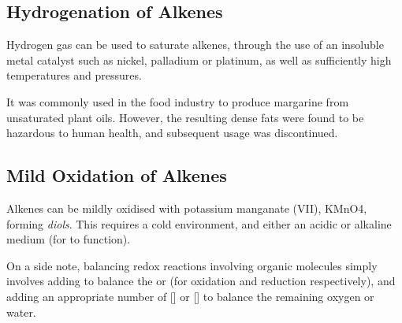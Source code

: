 		\vspace{1.0em}








\pagebreak
\subsection{Hydrogenation of Alkenes}

	Hydrogen gas can be used to saturate alkenes, through the use of an insoluble metal catalyst such as nickel, palladium or platinum,
	as well as sufficiently high temperatures and pressures.

	It was commonly used in the food industry to produce margarine from unsaturated plant oils. However, the resulting dense fats were
	found to be hazardous to human health, and subsequent usage was discontinued.






\pagebreak
\subsection{Mild Oxidation of Alkenes}

	Alkenes can be mildly oxidised with potassium manganate (VII), KMnO4, forming \textit{diols}. This requires a cold environment,
	and either an acidic or alkaline medium (for  to function).

	On a side note, balancing redox reactions involving organic molecules simply involves adding  to balance the
	 or  (for oxidation and reduction respectively), and adding an appropriate number of [] or []
	to balance the remaining oxygen or water.



